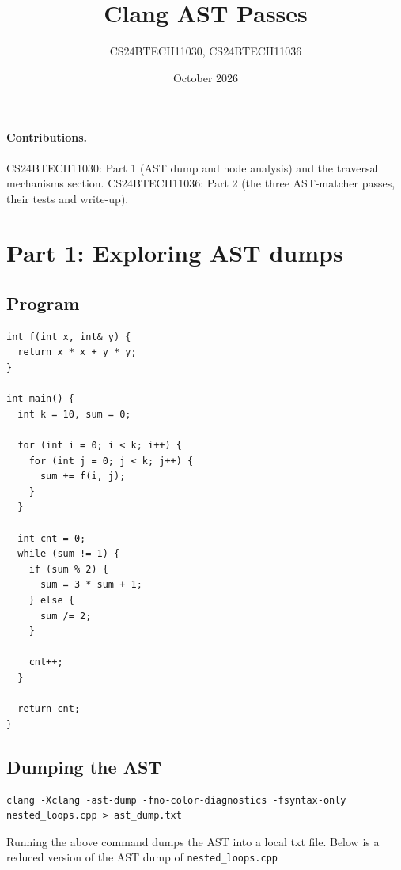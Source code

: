\documentclass[11pt,a4paper]{article}
\title{Clang AST Passes}
\author{CS24BTECH11030, CS24BTECH11036}
\date{October 2026}
\begin{document}
\maketitle

\paragraph{Contributions.}
CS24BTECH11030: Part 1 (AST dump and node analysis) and the traversal mechanisms section.
CS24BTECH11036: Part 2 (the three AST-matcher passes, their tests and write-up).

\section{Part 1: Exploring AST dumps}

\subsection{Program}

\begin{Verbatim}[fontsize=\footnotesize,frame=single]
int f(int x, int& y) {
  return x * x + y * y;
}

int main() {
  int k = 10, sum = 0;
  
  for (int i = 0; i < k; i++) {
    for (int j = 0; j < k; j++) {
      sum += f(i, j);
    }
  }

  int cnt = 0;
  while (sum != 1) {
    if (sum % 2) {
      sum = 3 * sum + 1;
    } else {
      sum /= 2;
    }

    cnt++;
  }

  return cnt;
}
\end{Verbatim}

\subsection{Dumping the AST}
\begin{Verbatim}[fontsize=\footnotesize]
clang -Xclang -ast-dump -fno-color-diagnostics -fsyntax-only nested_loops.cpp > ast_dump.txt
\end{Verbatim}
Running the above command dumps the AST into a local txt file. Below is a reduced version of the AST dump of \texttt{nested\_loops.cpp}
\end{document}
